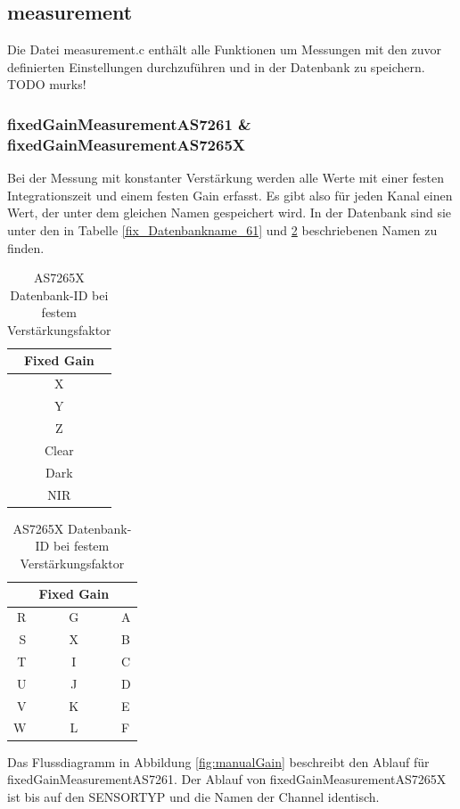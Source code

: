 \subsection{measurement}\label{measurement-c}
Die Datei measurement.c enthält alle Funktionen um Messungen mit den zuvor definierten Einstellungen durchzuführen und in der Datenbank zu speichern.
TODO murks!

\subsubsection{fixedGainMeasurementAS7261 \& fixedGainMeasurementAS7265X}
Bei der Messung mit konstanter Verstärkung werden alle Werte mit einer festen Integrationszeit und einem festen Gain erfasst. Es gibt also für jeden Kanal einen Wert, der unter dem gleichen Namen gespeichert wird. In der Datenbank sind sie unter den in Tabelle \ref{fix_Datenbankname_61} und \ref{fix_Datenbankname_65} beschriebenen Namen zu finden.

\begin{table}[H]
\parbox{.45\linewidth}{
\centering
\begin{tabular}{ c }
Fixed Gain \\
\hline
X \\ 
Y  \\
Z  \\
Clear \\ 
Dark \\ 
NIR \\ 
\end{tabular}
\caption{AS7261 Datenbank-ID bei festem Verstärkungsfaktor}
\label{fix_Datenbankname_61}

}
\hfill
\parbox{.45\linewidth}{
\centering
\begin{tabular}{ r c l}
&Fixed Gain \\
\hline
 	R & G & A \\  
 	S & X & B \\
 	T & I & C \\  
 	U & J & D \\
 	V & K & E \\  
 	W & L & F \\

\end{tabular}
\caption{AS7265X Datenbank-ID bei festem Verstärkungsfaktor}
\label{fix_Datenbankname_65}
}
\end{table}




\noindent Das Flussdiagramm in Abbildung \ref{fig:manualGain} beschreibt den Ablauf für fixedGainMeasurementAS7261.
Der Ablauf von fixedGainMeasurementAS7265X ist bis auf den SENSORTYP und die Namen der Channel identisch.

